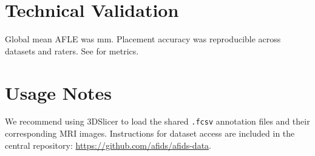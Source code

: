 \section{Technical Validation}
Global mean AFLE was  mm. Placement accuracy was reproducible across datasets and raters. See for metrics.

\section{Usage Notes}
We recommend using 3DSlicer to load the shared \texttt{.fcsv} annotation files and their corresponding MRI images. Instructions for dataset access are included in the central repository: \url{https://github.com/afids/afids-data}.


